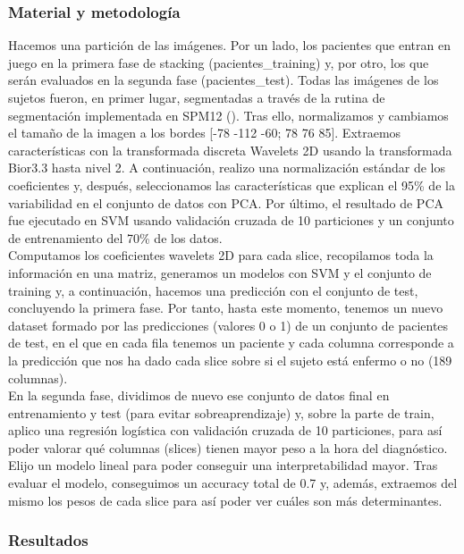 \subsubsection{Material y metodología}

Hacemos una partición de las imágenes. Por un lado, los pacientes que entran en juego en la primera fase de stacking (pacientes\_training) y, por otro, los que serán evaluados en la segunda fase (pacientes\_test). Todas las imágenes de los sujetos fueron, en primer lugar, segmentadas a través de la rutina de segmentación implementada en SPM12 (\cite{spm}). Tras ello, normalizamos y cambiamos el tamaño de la imagen a los bordes [-78 -112 -60; 78 76 85]. Extraemos características con la transformada discreta Wavelets 2D usando la transformada Bior3.3 hasta nivel 2. A continuación, realizo una normalización estándar de los coeficientes y, después, seleccionamos las características que explican el 95\% de la variabilidad en el conjunto de datos con PCA. Por último, el resultado de PCA fue ejecutado en SVM usando validación cruzada de 10 particiones y un conjunto de entrenamiento del 70\% de los datos. \\

Computamos los coeficientes wavelets 2D para cada slice, recopilamos toda la información en una matriz, generamos un modelos con SVM y el conjunto de training y, a continuación, hacemos una predicción con el conjunto de test, concluyendo la primera fase. Por tanto, hasta este momento, tenemos un nuevo dataset formado por las predicciones (valores 0 o 1) de un conjunto de pacientes de test, en el que en cada fila tenemos un paciente y cada columna corresponde a la predicción que nos ha dado cada slice sobre si el sujeto está enfermo o no (189 columnas). \\

En la segunda fase, dividimos de nuevo ese conjunto de datos final en entrenamiento y test (para evitar sobreaprendizaje) y, sobre la parte de train, aplico una regresión logística con validación cruzada de 10 particiones, para así poder valorar qué columnas (slices) tienen mayor peso a la hora del diagnóstico. Elijo un modelo lineal para poder conseguir una interpretabilidad mayor. Tras evaluar el modelo, conseguimos un accuracy total de 0.7 y, además, extraemos del mismo los pesos de cada slice para así poder ver cuáles son más determinantes.

\subsubsection{Resultados}

